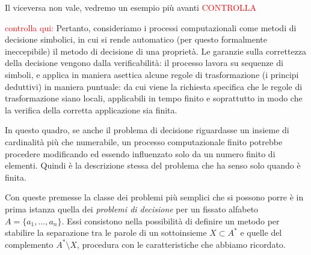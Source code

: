 Il viceversa non vale, vedremo un esempio più avanti \textcolor{red}{CONTROLLA}

\textcolor{red}{controlla qui:}
Pertanto, consideriamo i processi computazionali come metodi di decisione simbolici, in cui si rende automatico (per questo formalmente ineccepibile) il metodo di decisione di una proprietà. Le garanzie sulla correttezza della decisione vengono dalla verificabilità: il processo lavora su sequenze di simboli, e applica in maniera asettica alcune regole di trasformazione (i principi deduttivi) in maniera puntuale: da cui viene la richiesta specifica che le regole di trasformazione siano locali, applicabili in tempo finito e soprattutto in modo che la verifica della corretta applicazione sia finita.

In questo quadro, se anche il problema di decisione riguardasse un insieme di cardinalità più che numerabile, un processo computazionale finito potrebbe procedere modificando ed essendo influenzato solo da un numero finito di elementi. Quindi è la descrizione stessa del problema che ha senso solo quando è finita.

Con queste premesse la classe dei problemi più semplici che si possono porre è in prima istanza quella dei \textit{problemi di decisione} per un fissato alfabeto $A = \{a_1, \dots, a_n\}$. Essi consistono nella possibilità di definire un metodo per stabilire la separazione tra le parole di un sottoinsieme $X \subset A^*$ e quelle del complemento $A^* \setminus X$, procedura con le caratteristiche che abbiamo ricordato.
